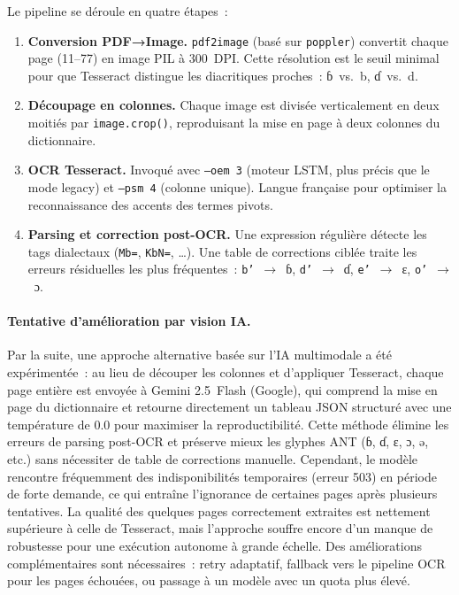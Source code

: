 \documentclass[11pt, a4paper, oneside]{article}
\begin{document}
Le pipeline se déroule en quatre étapes~:
\begin{enumerate}
  \item \textbf{Conversion PDF→Image.} \texttt{pdf2image} (basé sur \texttt{poppler}) convertit chaque page (11--77) en image PIL à 300~DPI. Cette résolution est le seuil minimal pour que Tesseract distingue les diacritiques proches~: ɓ~vs.~b, ɗ~vs.~d.
  \item \textbf{Découpage en colonnes.} Chaque image est divisée verticalement en deux moitiés par \texttt{image.crop()}, reproduisant la mise en page à deux colonnes du dictionnaire.
  \item \textbf{OCR Tesseract.} Invoqué avec \texttt{--oem~3} (moteur LSTM, plus précis que le mode legacy) et \texttt{--psm~4} (colonne unique). Langue française pour optimiser la reconnaissance des accents des termes pivots.
  \item \textbf{Parsing et correction post-OCR.} Une expression régulière détecte les tags dialectaux (\texttt{Mb=}, \texttt{KbN=}, \dots). Une table de corrections ciblée traite les erreurs résiduelles les plus fréquentes~: \texttt{b'}~$\to$~ɓ, \texttt{d'}~$\to$~ɗ, \texttt{e'}~$\to$~ɛ, \texttt{o'}~$\to$~ɔ.
\end{enumerate}

\paragraph{Tentative d'amélioration par vision IA.} Par la suite, une approche alternative basée sur l'IA multimodale a été expérimentée~: au lieu de découper les colonnes et d'appliquer Tesseract, chaque page entière est envoyée à Gemini 2.5~Flash (Google), qui comprend la mise en page du dictionnaire et retourne directement un tableau JSON structuré avec une température de 0.0 pour maximiser la reproductibilité. Cette méthode élimine les erreurs de parsing post-OCR et préserve mieux les glyphes ANT (ɓ, ɗ, ɛ, ɔ, ə, etc.) sans nécessiter de table de corrections manuelle. Cependant, le modèle rencontre fréquemment des indisponibilités temporaires (erreur 503) en période de forte demande, ce qui entraîne l'ignorance de certaines pages après plusieurs tentatives. La qualité des quelques pages correctement extraites est nettement supérieure à celle de Tesseract, mais l'approche souffre encore d'un manque de robustesse pour une exécution autonome à grande échelle. Des améliorations complémentaires sont nécessaires~: retry adaptatif, fallback vers le pipeline OCR pour les pages échouées, ou passage à un modèle avec un quota plus élevé.
\end{document}
